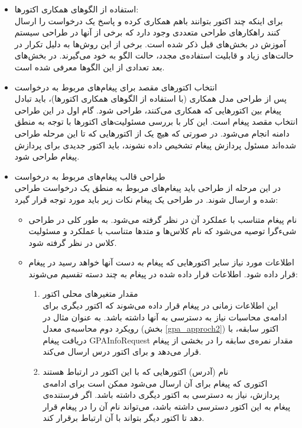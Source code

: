 \begin{itemize}
\item استفاده از الگوهای همکاری اکتورها:\\
برای اینکه چند اکتور بتوانند باهم همکاری کرده و پاسخ یک درخواست را ارسال کنند راهکارهای طراحی متعددی وجود دارد که برخی از آنها در طراحی سیستم آموزش در بخش‌های قبل ذکر شده است. برخی از این روش‌ها به دلیل تکرار در حالت‌های زیاد و قابلیت استفاده‌ی مجدد، حالت الگو به خود می‌گیرند. در بخش‌های بعد تعدادی از این الگوها معرفی شده است.
\item انتخاب اکتورهای مقصد برای پیغام‌های مربوط به درخواست\\
 پس از طراحی مدل همکاری (با استفاده از الگوهای همکاری اکتورها)، باید تبادل پیغام بین اکتورهایی که همکاری می‌کنند، طراحی شود. گام اول در این طراحی انتخاب مقصد پیغام است. این کار با بررسی مسئولیت‌های اکتورها با توجه به منطق دامنه انجام می‌شود. در صورتی که هیچ یک از اکتورهایی که تا این مرحله طراحی شده‌اند مسئول پردازش پیغام تشخیص داده نشوند،‌ باید اکتور جدیدی برای پردازش پیغام طراحی شود.
\item طراحی قالب پیغام‌های مربوط به درخواست\\
در این مرحله از طراحی باید پیغام‌های مربوط به منطق یک درخواست طراحی شده و ارسال شوند. در طراحی یک پیغام نکات زیر باید مورد توجه قرار گیرد:
\begin{itemize}
\item نام پیغام متناسب با عملکرد آن در نظر گرفته می‌شود. 
به طور کلی در طراحی شیءگرا توصیه می‌شود که نام کلاس‌ها و متدها متناسب با عملکرد و مسئولیت کلاس در نظر گرفته شود.
\item اطلاعات مورد نیاز سایر اکتورهایی که پیغام به دست‌ آنها خواهد رسید در پیغام قرار داده شود.
اطلاعات قرار داده شده در پیغام به چند دسته تقسیم می‌شوند:\\
\begin{enumerate}
\item مقدار متغیر‌های محلی اکتور\\
 این اطلاعات زمانی در پیغام قرار داده می‌شوند که اکتور دیگری برای ادامه‌ی محاسبات نیاز به دسترسی به آنها داشته باشد. به عنوان مثال در رویکرد دوم محاسبه‌ی معدل (بخش \ref{gpa_approch2}) اکتور سابقه، با دریافت پیغام GPAInfoRequest مقدار نمره‌ی سابقه را در بخشی از پیغام قرار می‌دهد و برای اکتور درس ارسال می‌کند.
\item نام (آدرس) اکتورهایی که با این اکتور در ارتباط هستند\\
اکتوری که پیغام برای آن ارسال می‌شود ممکن است برای ادامه‌ی پردازش، نیاز به دسترسی به اکتور دیگری داشته باشد. اگر فرستنده‌ی پیغام به این اکتور دسترسی داشته باشد، می‌تواند نام آن را در پیغام قرار دهد تا اکتور دیگر بتواند با آن ارتباط برقرار کند.

\end{enumerate}
\end{itemize}
\end{itemize}

